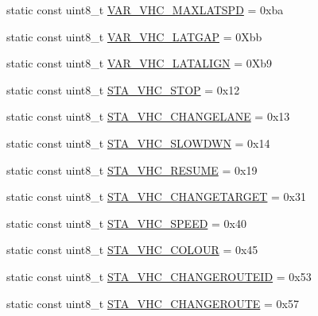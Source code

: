 \begin{DoxyCompactItemize}
\item 
static const uint8\+\_\+t \hyperlink{classtraci__api_1_1_vehicle_manager_a927209bd0f94d9e2a7542356d74b89e7}{V\+A\+R\+\_\+\+V\+H\+C\+\_\+\+M\+A\+X\+L\+A\+T\+S\+PD} = 0xba
\item 
static const uint8\+\_\+t \hyperlink{classtraci__api_1_1_vehicle_manager_ae668bae1944b885b0d6c946d3df3b5ec}{V\+A\+R\+\_\+\+V\+H\+C\+\_\+\+L\+A\+T\+G\+AP} = 0\+Xbb
\item 
static const uint8\+\_\+t \hyperlink{classtraci__api_1_1_vehicle_manager_a3866fb6c1b6d1a0011455300f40a18cb}{V\+A\+R\+\_\+\+V\+H\+C\+\_\+\+L\+A\+T\+A\+L\+I\+GN} = 0\+Xb9
\item 
static const uint8\+\_\+t \hyperlink{classtraci__api_1_1_vehicle_manager_a9fcda576e35eb8c34ad6fd4808221acc}{S\+T\+A\+\_\+\+V\+H\+C\+\_\+\+S\+T\+OP} = 0x12
\item 
static const uint8\+\_\+t \hyperlink{classtraci__api_1_1_vehicle_manager_a650f7cfb39b3f3dab9c06612bb401b34}{S\+T\+A\+\_\+\+V\+H\+C\+\_\+\+C\+H\+A\+N\+G\+E\+L\+A\+NE} = 0x13
\item 
static const uint8\+\_\+t \hyperlink{classtraci__api_1_1_vehicle_manager_acb211c131fc74c5e73bbeea542c3eb1a}{S\+T\+A\+\_\+\+V\+H\+C\+\_\+\+S\+L\+O\+W\+D\+WN} = 0x14
\item 
static const uint8\+\_\+t \hyperlink{classtraci__api_1_1_vehicle_manager_ad6cf6390198a926c352e9573274f17bc}{S\+T\+A\+\_\+\+V\+H\+C\+\_\+\+R\+E\+S\+U\+ME} = 0x19
\item 
static const uint8\+\_\+t \hyperlink{classtraci__api_1_1_vehicle_manager_a20db78dac81e4bfe3883327d6ac4dffc}{S\+T\+A\+\_\+\+V\+H\+C\+\_\+\+C\+H\+A\+N\+G\+E\+T\+A\+R\+G\+ET} = 0x31
\item 
static const uint8\+\_\+t \hyperlink{classtraci__api_1_1_vehicle_manager_ab660207279fb64c012d1bf7eaeece414}{S\+T\+A\+\_\+\+V\+H\+C\+\_\+\+S\+P\+E\+ED} = 0x40
\item 
static const uint8\+\_\+t \hyperlink{classtraci__api_1_1_vehicle_manager_a60ca45b4d097f18bc8370ed98b712944}{S\+T\+A\+\_\+\+V\+H\+C\+\_\+\+C\+O\+L\+O\+UR} = 0x45
\item 
static const uint8\+\_\+t \hyperlink{classtraci__api_1_1_vehicle_manager_a3373c7c01e939ddc8b83e9a6d650ef8e}{S\+T\+A\+\_\+\+V\+H\+C\+\_\+\+C\+H\+A\+N\+G\+E\+R\+O\+U\+T\+E\+ID} = 0x53
\item 
static const uint8\+\_\+t \hyperlink{classtraci__api_1_1_vehicle_manager_ab2864115d4a4d0b3418f7c0c336f7b50}{S\+T\+A\+\_\+\+V\+H\+C\+\_\+\+C\+H\+A\+N\+G\+E\+R\+O\+U\+TE} = 0x57
\item 

\end{DoxyCompactItemize}
